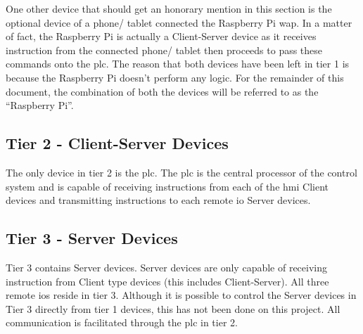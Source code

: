         One other device that should get an honorary mention in this section is the optional device of a  phone/ tablet connected the Raspberry Pi \acrshort{wap}. In a matter of fact, the Raspberry Pi is actually a Client-Server device as it receives instruction from the connected phone/ tablet then proceeds to pass these commands onto the \acrshort{plc}. The reason that both devices have been left in tier 1 is because the Raspberry Pi doesn’t perform any logic. For the remainder of this document, the combination of both the devices will be referred to as the “Raspberry Pi”.

        \subsection{Tier 2 - Client-Server Devices}

        The only device in tier 2 is the \acrshort{plc}. The \acrshort{plc} is the central processor of the control system and is capable of receiving instructions from each of the \acrshort{hmi} Client devices and transmitting instructions to each remote \acrshort{io} Server devices. 

        \subsection{Tier 3 - Server Devices}

        Tier 3 contains Server devices. Server devices are only capable of receiving instruction from Client type devices (this includes Client-Server). All three remote \acrshort{io}s reside in tier 3. Although it is possible to control the Server devices in Tier 3 directly from tier 1 devices, this has not been done on this project. All communication is facilitated through the \acrshort{plc} in tier 2.




    
    
    
    